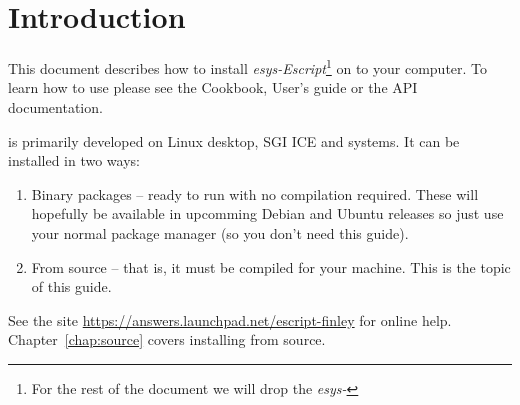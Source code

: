 %
%
%

\chapter{Introduction}
This document describes how to install \emph{esys-Escript}\footnote{For the rest of the document we will drop the \emph{esys-}} on to your computer.
To learn how to use \esfinley please see the Cookbook, User's guide or the API documentation.

\esfinley is primarily developed on Linux desktop, SGI ICE and \macosx systems.
It can be installed in two ways:
\begin{enumerate}
  \item Binary packages -- ready to run with no compilation required. These will hopefully be available in upcomming Debian and Ubuntu releases so just use your normal package manager (so you don't need this guide).
  \item From source -- that is, it must be compiled for your machine.
This is the topic of this guide.
\end{enumerate}

See the site \url{https://answers.launchpad.net/escript-finley} for online help.
Chapter~\ref{chap:source} covers installing from source.



